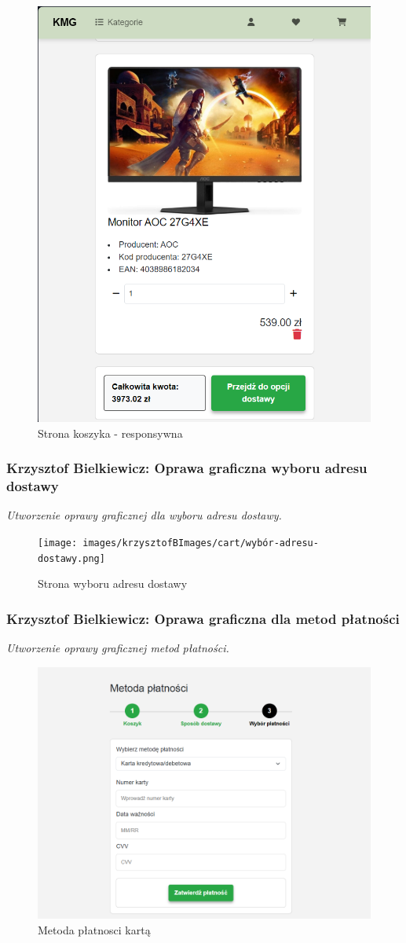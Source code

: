 \documentclass[12pt,a4paper,oneside]{article}
\theoremstyle{definition}
\numberwithin{equation}{section}
\begin{document}
\begin{figure}[H]
    \centering
    \includegraphics[width=0.5\columnwidth]{images/krzysztofBImages/cart/cart-step1-respo.png}
    \caption{Strona koszyka - responsywna}
    \label{cart-step1-respo}
\end{figure}

\subsubsection{Krzysztof Bielkiewicz: Oprawa graficzna wyboru adresu dostawy}
\label{1.3.9}
\textit{Utworzenie oprawy graficznej dla wyboru adresu dostawy.}
\begin{figure}[H]
    \centering
    \texttt{[image: images/krzysztofBImages/cart/wybór-adresu-dostawy.png]}
    \caption{Strona wyboru adresu dostawy}
    \label{płatność-kartą}
\end{figure}

\subsubsection{Krzysztof Bielkiewicz: Oprawa graficzna dla metod płatności}
\label{1.3.10}
\textit{Utworzenie oprawy graficznej metod płatności.}
\begin{figure}[H]
    \centering
    \includegraphics[width=0.8\columnwidth]{images/krzysztofBImages/cart/metody-płatności-karta.png}
    \caption{Metoda płatnosci kartą}
    \label{płatność-karta}
\end{figure}
\end{document}
